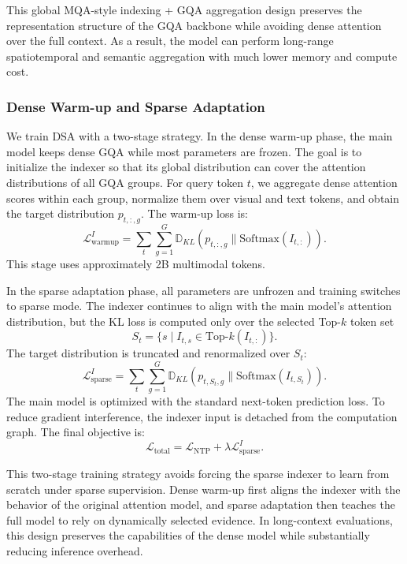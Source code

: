 \documentclass{article} %
\begin{document}
This global MQA-style indexing + GQA aggregation design preserves the representation structure of the GQA backbone while avoiding dense attention over the full context. As a result, the model can perform long-range spatiotemporal and semantic aggregation with much lower memory and compute cost.

\subsubsection{Dense Warm-up and Sparse Adaptation}

We train DSA with a two-stage strategy. In the dense warm-up phase, the main model keeps dense GQA while most parameters are frozen. The goal is to initialize the indexer so that its global distribution can cover the attention distributions of all GQA groups. For query token $t$, we aggregate dense attention scores within each group, normalize them over visual and text tokens, and obtain the target distribution $p_{t,:,g}$. The warm-up loss is:
\begin{equation}
    \mathcal{L}_{\mathrm{warmup}}^{I} =
    \sum_t \sum_{g=1}^{G}
    \mathbb{D}_{KL}(p_{t,:,g} \parallel \mathrm{Softmax}(I_{t,:})).
\end{equation}
This stage uses approximately 2B multimodal tokens.

In the sparse adaptation phase, all parameters are unfrozen and training switches to sparse mode. The indexer continues to align with the main model's attention distribution, but the KL loss is computed only over the selected Top-$k$ token set
\begin{equation}
S_t = \{s \mid I_{t,s} \in \mathrm{Top}\text{-}k(I_{t,:})\}.
\end{equation}
The target distribution is truncated and renormalized over $S_t$:
\begin{equation}
    \mathcal{L}_{\mathrm{sparse}}^{I} =
    \sum_t \sum_{g=1}^{G}
    \mathbb{D}_{KL}(p_{t,S_t,g} \parallel \mathrm{Softmax}(I_{t,S_t})).
\end{equation}
The main model is optimized with the standard next-token prediction loss. To reduce gradient interference, the indexer input is detached from the computation graph. The final objective is:
\begin{equation}
    \mathcal{L}_{\mathrm{total}} =
    \mathcal{L}_{\mathrm{NTP}} + \lambda \mathcal{L}_{\mathrm{sparse}}^{I}.
\end{equation}

This two-stage training strategy avoids forcing the sparse indexer to learn from scratch under sparse supervision. Dense warm-up first aligns the indexer with the behavior of the original attention model, and sparse adaptation then teaches the full model to rely on dynamically selected evidence. In long-context evaluations, this design preserves the capabilities of the dense model while substantially reducing inference overhead.
\end{document}
